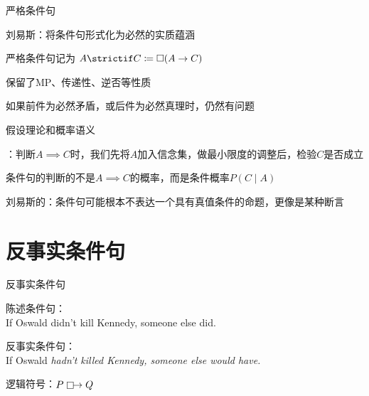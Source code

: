 \documentclass{zhslides}
\begin{document}
\begin{frame}{严格条件句}
  
  \bit
    \item 刘易斯：将条件句形式化为必然的实质蕴涵
    \item 严格条件句记为 $A \strictimplies C \defeq \Box(A \implies C)$
    \item 保留了MP、传递性、逆否等性质
    \item 如果前件为必然矛盾，或后件为必然真理时，仍然有问题
  \eit

\end{frame}


\begin{frame}{假设理论和概率语义}
  
  \bit
    \item {}：判断$A \implies C$时，我们先将$A$加入信念集，做最小限度的调整后，检验$C$是否成立
    \item 条件句的判断的不是$A \implies C$的概率，而是条件概率$P(C \mid A)$
    \item 刘易斯的：条件句可能根本不表达一个具有真值条件的命题，更像是某种断言
  \eit

\end{frame}



\section{反事实条件句}

\begin{frame}{反事实条件句}
  
  陈述条件句：\\
  \quad If Oswald didn't kill Kennedy, someone else did.
  \vspace{1ex}
  
  反事实条件句：\\
  \quad If Oswald \em<2->{hadn't} killed Kennedy, someone else \em<2->{would have}.
  
  \vspace{2em}
  \pause
  逻辑符号：$P \mathrel{\mathop\Box}\mathrel{\mkern-2.5mu}\rightarrow Q$
  
\end{frame}
\end{document}
